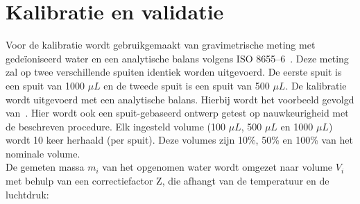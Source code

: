 \section{Kalibratie en validatie}
Voor de kalibratie wordt gebruikgemaakt van gravimetrische meting met gedeïoniseerd water en een analytische balans volgens ISO 8655--6\ \cite{RN50}. Deze meting zal op twee verschillende spuiten identiek worden uitgevoerd. De eerste spuit is een spuit van 1000 $\mu L$ en de tweede spuit is een spuit van 500 $\mu L$. De kalibratie wordt uitgevoerd met een analytische balans.
Hierbij wordt het voorbeeld gevolgd van\ \cite{RN49}. Hier wordt ook een spuit-gebaseerd ontwerp getest op nauwkeurigheid met de beschreven procedure.
Elk ingesteld volume (100 $\mu L$, 500 $\mu L$ en 1000 $\mu L$) wordt 10 keer herhaald (per spuit). Deze volumes zijn 10\%, 50\% en 100\% van het nominale volume. 
\\[12pt]De gemeten massa $m_i$ van het opgenomen water wordt omgezet naar volume $V_i$ met behulp van een correctiefactor Z, die afhangt van de temperatuur en de luchtdruk:

